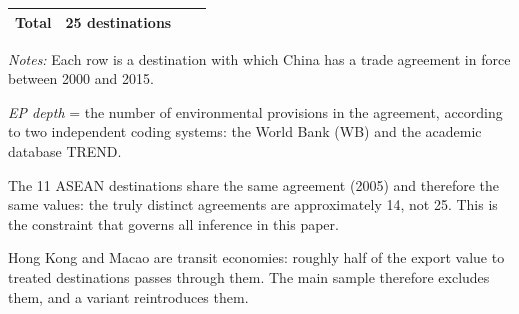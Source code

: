 \begin{table}[htbp]
\begin{threeparttable}
\begin{tabular}{llcc}
\midrule
\textbf{Total} & 25 destinations & & \\
\bottomrule
\end{tabular}
\begin{tablenotes}[flushleft]\footnotesize
\item \emph{Notes:} Each row is a destination with which China has a trade agreement in force between 2000 and 2015.
\item \textit{EP depth} = the number of environmental provisions in the agreement, according to two independent coding systems: the World Bank (WB) and the academic database TREND.
\item The 11 ASEAN destinations share the same agreement (2005) and therefore the same values: the truly distinct agreements are approximately 14, not 25. This is the constraint that governs all inference in this paper.
\item Hong Kong and Macao are transit economies: roughly half of the export value to treated destinations passes through them. The main sample therefore excludes them, and a variant reintroduces them.
\end{tablenotes}
\end{threeparttable}
\end{table}
